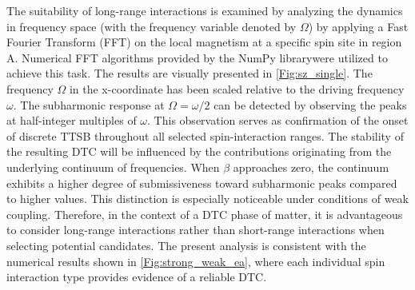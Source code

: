 \documentclass[12pt]{iopart}
\providecommand{\DIFaddtex}[1]{{\protect\color{red}\uwave{#1}}} %
\providecommand{\DIFdeltex}[1]{{}}                      %
\providecommand{\DIFaddbegin}{} %
\providecommand{\DIFaddend}{} %
\providecommand{\DIFdelbegin}{} %
\providecommand{\DIFdelend}{} %
\providecommand{\DIFaddbeginFL}{} %
\providecommand{\DIFdelendFL}{} %
\providecommand{\DIFadd}[1]{\texorpdfstring{\DIFaddtex{#1}}{#1}} %
\providecommand{\DIFdel}[1]{\texorpdfstring{\DIFdeltex{#1}}{}} %
\newcommand{\DIFscaledelfig}{0.5}
\newlength{\DIFdelgraphicswidth} %
\newlength{\DIFdelgraphicsheight} %
\newcommand{\DIFaddincludegraphics}[2][]{{\color{blue}\fbox{\DIFOincludegraphics[#1]{#2}}}} %
\newcommand{\DIFdelincludegraphics}[2][]{%
\sbox{\DIFdelgraphicsbox}{\DIFOincludegraphics[#1]{#2}}%
\settoboxwidth{\DIFdelgraphicswidth}{\DIFdelgraphicsbox} %
\settoboxtotalheight{\DIFdelgraphicsheight}{\DIFdelgraphicsbox} %
\scalebox{\DIFscaledelfig}{%
\parbox[b]{\DIFdelgraphicswidth}{\usebox{\DIFdelgraphicsbox}\\[-\baselineskip] \rule{\DIFdelgraphicswidth}{0em}}\llap{\resizebox{\DIFdelgraphicswidth}{\DIFdelgraphicsheight}{%
\setlength{\unitlength}{\DIFdelgraphicswidth}%
\begin{picture}(1,1)%
\thicklines\linethickness{2pt} %
{\color[rgb]{1,0,0}\put(0,0){\framebox(1,1){}}}%
{\color[rgb]{1,0,0}\put(0,0){\line( 1,1){1}}}%
{\color[rgb]{1,0,0}\put(0,1){\line(1,-1){1}}}%
\end{picture}%
}\hspace*{3pt}}} %
} %
\DeclareRobustCommand{\DIFaddbegin}{\DIFOaddbegin \let\includegraphics\DIFaddincludegraphics} %
\DeclareRobustCommand{\DIFaddend}{\DIFOaddend \let\includegraphics\DIFOincludegraphics} %
\DeclareRobustCommand{\DIFdelbegin}{\DIFOdelbegin \let\includegraphics\DIFdelincludegraphics} %
\DeclareRobustCommand{\DIFdelend}{\DIFOaddend \let\includegraphics\DIFOincludegraphics} %
\DeclareRobustCommand{\DIFaddbeginFL}{\DIFOaddbeginFL \let\includegraphics\DIFaddincludegraphics} %
\DeclareRobustCommand{\DIFdelendFL}{\DIFOaddendFL \let\includegraphics\DIFOincludegraphics} %
\begin{document}
The suitability of long-range interactions is examined by analyzing the dynamics in frequency space (with the frequency variable denoted by $\Omega$) by applying a Fast Fourier Transform (FFT) on the local magnetism at a specific spin site \DIFdelbegin \DIFdel{$(site(i)=1)$ }\DIFdelend \DIFaddbegin \DIFadd{$(i=1)$ }\DIFaddend in region A. Numerical FFT algorithms provided by the NumPy library\DIFaddbegin \DIFadd{~\mbox{%
\cite{harris2020array} }\hspace{0pt}%
}\DIFaddend were utilized to achieve this task\DIFdelbegin \DIFdel{~\mbox{%
\cite{harris2020array}}\hspace{0pt}%
}\DIFdelend . The results are visually presented in \DIFdelbegin \DIFdel{Fig.}\DIFdelend \DIFaddbegin \DIFadd{figure~}\DIFaddend \ref{Fig:sz_single}.  The frequency $\Omega$ in the x-coordinate has been scaled relative to the driving frequency $\omega$. The subharmonic response at $\Omega=\omega/2$ can be detected by observing the peaks at half-integer multiples of $\omega$. This observation serves as confirmation of the onset of discrete TTSB throughout all selected spin-interaction ranges. The stability of the resulting DTC will be influenced by the contributions originating from the underlying continuum of frequencies. When $\beta$ approaches zero, the continuum exhibits a higher degree of submissiveness toward subharmonic peaks compared to higher values. This distinction is especially noticeable under conditions of weak coupling. Therefore, in the context of a DTC phase of matter, it is advantageous to consider long-range interactions rather than short-range interactions when selecting potential candidates. The present analysis is consistent with the numerical results shown in \DIFdelbegin \DIFdel{Fig.}\DIFdelend \DIFaddbegin \DIFadd{figure~}\DIFaddend \ref{Fig:strong_weak_ea}, where each individual spin interaction type provides evidence of a reliable DTC.
\DIFdelbegin %
\DIFdelendFL \DIFaddbeginFL 
\end{document}
